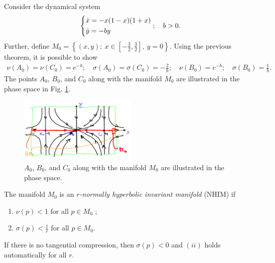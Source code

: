 \begin{ex}[]
	Consider the dynamical system
	\begin{align}
		\begin{dcases}
			\dot{x} = -x(1-x)(1+x) \\
			\dot{y} = -by
		\end{dcases}
		;\quad b>0.
	\end{align}
	Further, define $M_0 = \left\{ (x,y):\ x\in \left[ -\frac{3}{2}, \frac{3}{2}\right],\ y=0 \right\}$. Using the previous theorem, it is possible to show
	\begin{align}
		\nu (A_0) = \nu (C_0) = e^{-b}; \quad \sigma(A_0) = \sigma(C_0) = - \frac{2}{b}; \quad
		\nu (B_0) = e^{-b}; \quad \sigma(B_0) = \frac{1}{b}.
	\end{align}
	The points $A_0$, $B_0$, and $C_0$ along with the manifold $M_0$ are illustrated in the phase space in Fig. \ref{fig:fenichel_ex1}.
	\begin{figure}[h!]
		\centering
		\includegraphics[width=0.5\textwidth]{figures/ch9/14fenichel_ex1.png}
		\caption{$A_0$, $B_0$, and $C_0$ along with the manifold $M_0$ are illustrated in the phase space.}
		\label{fig:fenichel_ex1}
	\end{figure}
\end{ex}

\begin{definition}
	The manifold $M_0$ is an \emph{$r$-normally hyperbolic invariant manifold} (NHIM) if
	\begin{enumerate}
		\item $\nu (p)<1$ for all $p\in M_0$ ;
		\item $\sigma(p) < \frac{1}{r}$ for all $p \in M_0$.
	\end{enumerate}	
\end{definition}
\begin{remark}[]
	If there is no tangential compression, then $\sigma(p)<0$ and $(ii)$ holds automatically for all $r$.
\end{remark}

